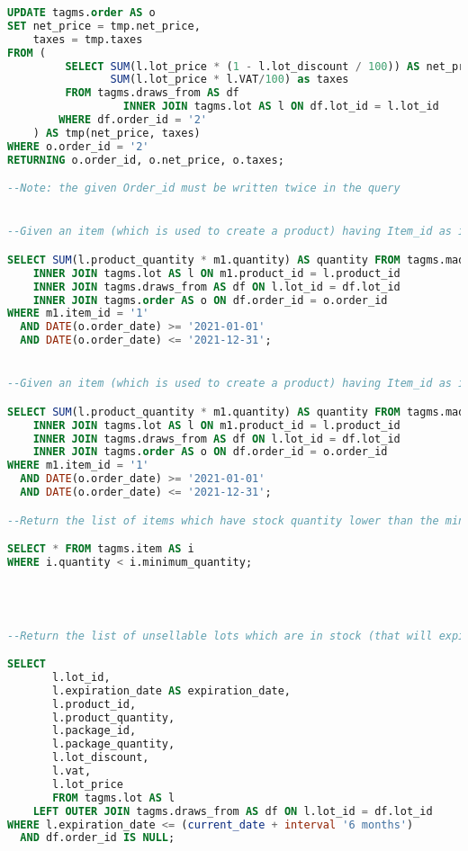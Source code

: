 \begin{lstlisting}[language=SQL,
keywordstyle=\color{blue},
stringstyle=\color{mauve},
showstringspaces=false,
breaklines=true,
basicstyle=\ttfamily\footnotesize]
UPDATE tagms.order AS o
SET net_price = tmp.net_price,
    taxes = tmp.taxes
FROM (
         SELECT SUM(l.lot_price * (1 - l.lot_discount / 100)) AS net_price,
                SUM(l.lot_price * l.VAT/100) as taxes
         FROM tagms.draws_from AS df
                  INNER JOIN tagms.lot AS l ON df.lot_id = l.lot_id
        WHERE df.order_id = '2'
    ) AS tmp(net_price, taxes)
WHERE o.order_id = '2'
RETURNING o.order_id, o.net_price, o.taxes;

--Note: the given Order_id must be written twice in the query


--Given an item (which is used to create a product) having Item_id as identifier and a time interval (actually, two dates),  find the total quantity of that item that has been used for production or packaging during that time.

SELECT SUM(l.product_quantity * m1.quantity) AS quantity FROM tagms.made_up_of_1 AS m1
    INNER JOIN tagms.lot AS l ON m1.product_id = l.product_id
    INNER JOIN tagms.draws_from AS df ON l.lot_id = df.lot_id
    INNER JOIN tagms.order AS o ON df.order_id = o.order_id
WHERE m1.item_id = '1'
  AND DATE(o.order_date) >= '2021-01-01'
  AND DATE(o.order_date) <= '2021-12-31';


--Given an item (which is used to create a product) having Item_id as identifier and a time interval (actually, two dates), find the total quantity of that item that has been used for production or packaging during that time.

SELECT SUM(l.product_quantity * m1.quantity) AS quantity FROM tagms.made_up_of_1 AS m1
    INNER JOIN tagms.lot AS l ON m1.product_id = l.product_id
    INNER JOIN tagms.draws_from AS df ON l.lot_id = df.lot_id
    INNER JOIN tagms.order AS o ON df.order_id = o.order_id
WHERE m1.item_id = '1'
  AND DATE(o.order_date) >= '2021-01-01'
  AND DATE(o.order_date) <= '2021-12-31';

--Return the list of items which have stock quantity lower than the minimum one.

SELECT * FROM tagms.item AS i
WHERE i.quantity < i.minimum_quantity;




--Return the list of unsellable lots which are in stock (that will expire in less than 6 months)

SELECT
       l.lot_id,
       l.expiration_date AS expiration_date,
       l.product_id,
       l.product_quantity,
       l.package_id,
       l.package_quantity,
       l.lot_discount,
       l.vat,
       l.lot_price
       FROM tagms.lot AS l
    LEFT OUTER JOIN tagms.draws_from AS df ON l.lot_id = df.lot_id
WHERE l.expiration_date <= (current_date + interval '6 months')
  AND df.order_id IS NULL;

\end{lstlisting}

